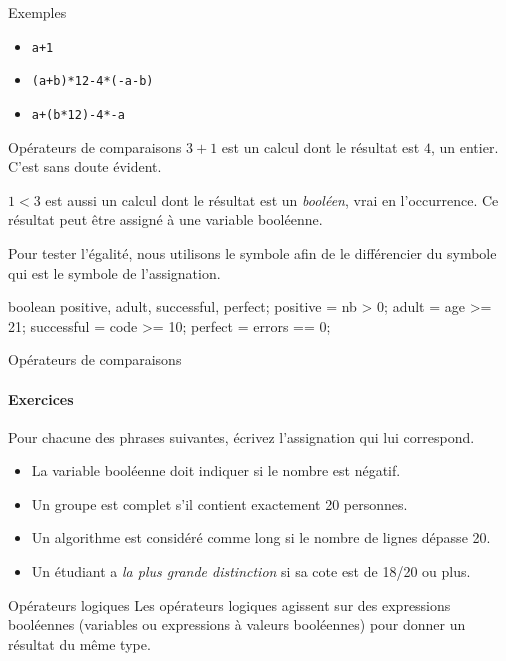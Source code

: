 \begin{hideedit}
\begin{frame}[fragile]{Exemples}
  \begin{itemize}[<+->]
    \item \Verb_a+1_
    \item \Verb_(a+b)*12-4*(-a-b)_
    \item \Verb_a+(b*12)-4*-a_
  \end{itemize}
\end{frame}

\begin{frame}[fragile]{Opérateurs de comparaisons}
  $3+1$ est un calcul dont le résultat est $4$, un entier. C'est sans
  doute évident.

  $1<3$ est aussi un calcul dont le résultat est un \emph{booléen},
  vrai en l’occurrence.  Ce résultat peut être assigné à une variable
  booléenne.

  Pour tester l'égalité, nous utilisons le symbole \pc{==} afin de le
  différencier du symbole \pc{=} qui est le symbole de l'assignation.

  \begin{java}
boolean positive, adult, successful, perfect;
positive = nb > 0;
adult = age >= 21;
successful = code >= 10;
perfect = errors == 0;
\end{java}
\end{frame}


\begin{frame}{Opérateurs de comparaisons}
  \framesubtitle{Exercices}
  Pour chacune des phrases suivantes,
  écrivez l’assignation qui lui correspond.
  \begin{itemize}
  \item 
    La variable booléenne 
    doit indiquer si le nombre  est négatif.
  \item
    Un groupe est complet s’il contient exactement 20 personnes.
  \item
    Un algorithme est considéré comme long si le nombre de lignes
    dépasse 20.
  \item 
    Un étudiant a \emph{la plus grande distinction} si sa cote est
    de 18/20 ou plus.
  \end{itemize}
\end{frame}

\begin{frame}{Opérateurs logiques}
  Les opérateurs logiques agissent sur des expressions booléennes 
  (variables ou expressions à valeurs booléennes) 
  pour donner un résultat du même type.


\end{frame}
\end{hideedit}
